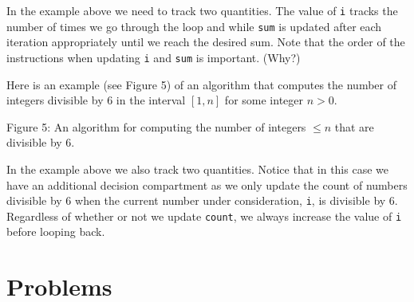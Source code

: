 \documentclass{ximera}
\begin{document}
In the example above we need to track two quantities. The value of \verb|i| tracks the number of times we go through the loop and while \verb|sum| is updated after each iteration appropriately until we reach the desired sum. Note that the order of the instructions when updating \verb|i| and \verb|sum| is important. (Why?)

Here is an example (see Figure 5) of an algorithm that computes the number of integers divisible by 6 in the interval $[1,n]$ for some integer $n>0$.

\begin{center}
\end{center}
\begin{center}
	Figure 5: An algorithm for computing the number of integers $\leq n$ that are divisible by 6.
\end{center}

In the example above we also track two quantities. Notice that in this case we have an additional decision compartment as we only update the count of numbers divisible by 6 when the current number under consideration, \verb|i|, is divisible by 6. Regardless of whether or not we update \verb|count|, we always increase the value of \verb|i| before looping back.

\section{Problems}
\end{document}
